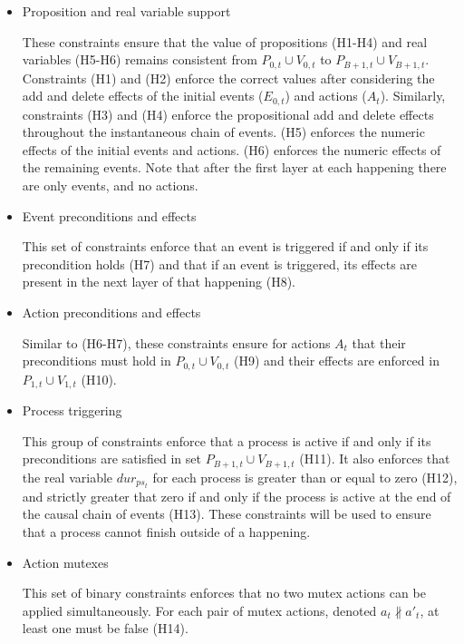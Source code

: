 \begin{itemize}

\item Proposition and real variable support

These constraints ensure that the value of propositions (H1-H4) and real variables (H5-H6) remains consistent from $P_{0,t}\cup V_{0,t}$ to $P_{B+1,t}\cup V_{B+1,t}$. Constraints (H1) and (H2) enforce the correct values after considering the add and delete effects of the initial events ($E_{0,t}$) and actions (${A_t}$). Similarly, constraints (H3) and (H4) enforce the propositional add and delete effects throughout the instantaneous chain of events. (H5) enforces the numeric effects of the initial events and actions. (H6) enforces the numeric effects of the remaining events. Note that after the first layer at each happening there are only events, and no actions.

\item Event preconditions and effects

This set of constraints enforce that an event is triggered if and only if its precondition holds (H7) and that if an event is triggered, its effects are present in the next layer of that happening (H8).

\item Action preconditions and effects

Similar to (H6-H7), these constraints ensure for actions $A_t$ that their preconditions must hold in $P_{0,t}\cup V_{0,t}$ (H9) and their effects are enforced in $P_{1,t}\cup V_{1,t}$ (H10).

\item Process triggering

This group of constraints enforce that a process is active if and only if its preconditions are satisfied in set $P_{B+1,t}\cup V_{B+1,t}$ (H11). It also enforces that the real variable $dur_{ps_t}$ for each process is greater than or equal to zero (H12), and strictly greater that zero if and only if the process is active at the end of the causal chain of events (H13). These constraints will be used to ensure that a process cannot finish outside of a happening.

\item Action mutexes

This set of binary constraints enforces that no two mutex actions can be applied simultaneously. For each pair of mutex actions, denoted $a_t \nparallel a'_t$, at least one must be false (H14).

\end{itemize}


